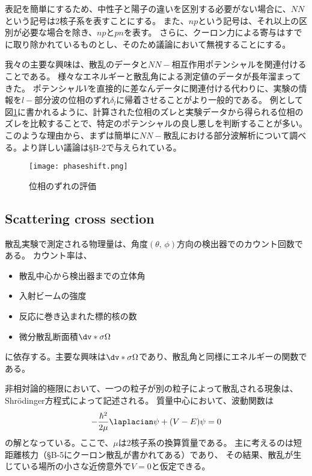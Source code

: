 \documentclass[a4paper,11pt,uplatex]{jsarticle}
\begin{document}
表記を簡単にするため、中性子と陽子の違いを区別する必要がない場合に、$NN$という記号は2核子系を表すことにする。
また、$np$という記号は、それ以上の区別が必要な場合を除き、$np$と$pn$を表す。
さらに、クーロン力による寄与はすでに取り除かれているものとし、そのため議論において無視することにする。

我々の主要な興味は、散乱のデータと$NN-$相互作用ポテンシャルを関連付けることである。
様々なエネルギーと散乱角による測定値のデータが長年溜まってきた。
ポテンシャル$V$を直接的に差なんデータに関連付ける代わりに、実験の情報を$l-$部分波の位相のずれ$\delta_l$に帰着させることがより一般的である。
例として図\ref{fig:3-3}に書かれるように、計算された位相のズレと実験データから得られる位相のズレを比較することで、特定のポテンシャルの良し悪しを判断することが多い。
このような理由から、まずは簡単に$NN-$散乱における部分波解析について調べる。より詳しい議論は\S{B-2}で与えられている。
\begin{figure}[H]
  \centering
  \texttt{[image: phaseshift.png]}
  \caption{位相のずれの評価}
  \label{fig:3-3}
\end{figure}

\newpage
\subsection*{Scattering cross section}
散乱実験で測定される物理量は、角度$(\theta,\,\phi)$方向の検出器でのカウント回数である。
カウント率は、
\begin{itemize}
  \item 散乱中心から検出器までの立体角
  \item 入射ビームの強度
  \item 反応に巻き込まれた標的核の数
  \item 微分散乱断面積$\dv*{\sigma}{\Omega}$
\end{itemize}
に依存する。主要な興味は$\dv*{\sigma}{\Omega}$であり、散乱角と同様にエネルギーの関数である。

非相対論的極限において、一つの粒子が別の粒子によって散乱される現象は、Shr\"{o}dinger方程式によって記述される。
質量中心において、波動関数は
\begin{equation}
  -\frac{\hbar^2}{2\mu}\laplacian\psi + (V-E)\psi=0
\end{equation}
の解となっている。ここで、$\mu$は2核子系の換算質量である。
主に考えるのは短距離核力（\S{B-5}にクーロン散乱が書かれてある）であり、
その結果、散乱が生じている場所の小さな近傍意外で$V=0$と仮定できる。
\end{document}
